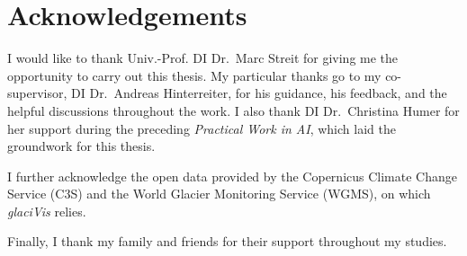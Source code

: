 
\ClearPage
{}
\chapter*{Acknowledgements}

I would like to thank Univ.-Prof. DI Dr.~Marc Streit for giving me the
opportunity to carry out this thesis. My particular thanks go to my
co-supervisor, DI Dr.~Andreas Hinterreiter, for his guidance, his feedback,
and the helpful discussions throughout the work. I also thank DI Dr.~Christina
Humer for her support during the preceding \textit{Practical Work in AI}, which
laid the groundwork for this thesis.

I further acknowledge the open data provided by the Copernicus Climate Change
Service (C3S) and the World Glacier Monitoring Service (WGMS), on which
\textit{glaciVis} relies.

Finally, I thank my family and friends for their support throughout my studies.